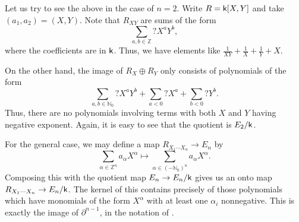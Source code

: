 \begin{ex}
	Let us try to see the above in the case of $n = 2$. Write $R = \mathsf{k}[X, Y]$ and take $(a_{1}, a_{2}) = (X, Y)$. Note that $R_{XY}$ are sums of the form
	\begin{equation*} 
		\sum_{a, b \in \mathbb{Z}} ? X^{a} Y^{b},
	\end{equation*}
	where the coefficients are in $\mathsf{k}$. \newline
	Thus, we have elements like $\frac{1}{XY} + \frac{1}{X} + \frac{1}{Y} + X$. 

	On the other hand, the image of $R_{X} \oplus R_{Y}$ only consists of polynomials of the form
	\begin{equation*} 
		\sum_{a, b \in \mathbb{N}_{0}} ? X^{a} Y^{b} + \sum_{a < 0} ? X^{a} + \sum_{b < 0} ? Y^{b}.
	\end{equation*}
	Thus, there are no polynomials involving terms with both $X$ and $Y$ having negative exponent. Again, it is easy to see that the quotient is $E_{2}/\mathsf{k}$.

	For the general case, we may define a map $R_{X_{1} \cdots X_{n}} \to E_{n}$ by
	\begin{equation*} 
		\sum_{\alpha \in \mathbb{Z}^{n}} a_{\alpha} X^{\alpha} \mapsto \sum_{\alpha \in (-\mathbb{N}_{0})^{n}} a_{\alpha} X^{\alpha}.
	\end{equation*}
	Composing this with the quotient map $E_{n} \to E_{n}/\mathsf{k}$ gives us an onto map $R_{X_{1} \cdots X_{n}} \to E_{n}/\mathsf{k}$. The kernel of this contains precisely of those polynomials which have monomials of the form $X^{\alpha}$ with at least one $\alpha_{i}$ nonnegative. This is exactly the image of $\partial^{n - 1}$, in the notation of .
\end{ex}

